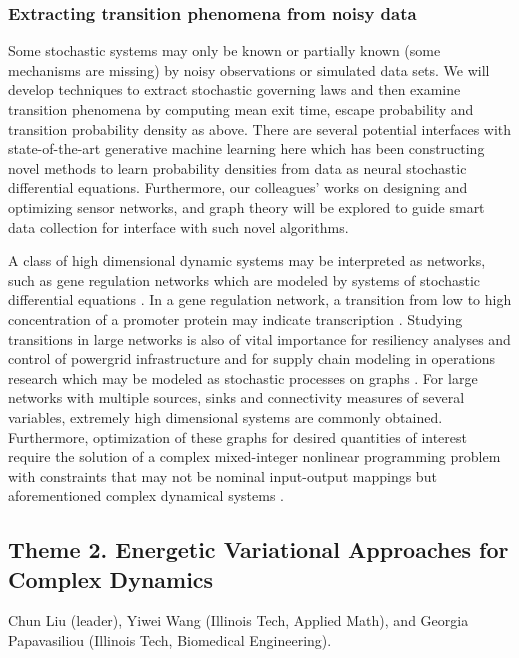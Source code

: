\documentclass[11pt]{NSFamsart}
\begin{document}
 
\subsubsection*{Extracting transition phenomena from noisy data}
Some   stochastic systems may only be known or partially known (some mechanisms are missing) by noisy observations or simulated data sets. We will  develop techniques to extract stochastic governing laws \cite{Wei2022AnOC, YangLi2020a, Li2022ExtractingGL, Lu2022LearningTT} and then examine transition phenomena by computing mean exit time, escape probability and transition probability density as above. 
There are several potential interfaces with state-of-the-art generative machine learning here which has been constructing novel methods to learn probability densities from data as neural stochastic differential equations. Furthermore, our colleagues'  works on 
designing and optimizing sensor networks, and graph theory \cite{karwa2016statistical,Calines2008MonitoringSF} will be explored to guide smart data collection for interface with such novel algorithms. 

A class of high dimensional dynamic systems may be interpreted as networks, such as   gene regulation networks \cite{Raser2005} which are modeled by systems of stochastic differential equations \cite{Suel06}.  In a gene regulation network, a transition from low to high concentration of a promoter protein may indicate transcription \cite{Stefan,ZLDK}. Studying transitions in large networks is also of vital importance for resiliency analyses and control of powergrid infrastructure and for supply chain modeling in operations research which may be modeled as stochastic processes on graphs \cite{shin2020graph,anghel2007stochastic,nardelli2014models}. For large networks with multiple sources, sinks and connectivity measures of several variables, extremely high dimensional systems are commonly obtained. Furthermore, optimization of these graphs for desired quantities of interest require the solution of a complex mixed-integer nonlinear programming problem with constraints that may not be nominal input-output mappings but aforementioned complex dynamical systems \cite{shin2020decentralized,sampat2017optimization,kim2019graph,shin2021exponential}.


\subsection*{Theme 2. Energetic Variational Approaches for Complex Dynamics}
Chun Liu (leader), Yiwei Wang (Illinois Tech, Applied Math), and Georgia Papavasiliou (Illinois Tech, Biomedical Engineering).
\end{document}

